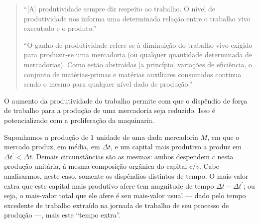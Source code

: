 \begin{quote}
``{[}A{]} produtividade sempre diz respeito ao trabalho. O nível de produtividade nos informa uma determinada relação entre o trabalho vivo executado e o produto.''

``O ganho de produtividade refere-se à diminuição do trabalho vivo exigido para produzir-se uma mercadoria (ou qualquer quantidade determinada de mercadorias). Como estão abstraídas {[}a princípio{]} variações de eficiência, o conjunto de matérias-primas e matérias auxiliares consumidos continua sendo o mesmo para qualquer nível dado de produção.'' \parencite[p. 233]{SaBarreto2021a}
\end{quote}

O aumento da produtividade do trabalho permite com que o dispêndio de força de trabalho para a produção de uma mercadoria seja reduzido. Isso é potencializado com a proliferação da maquinaria.

Suponhamos a produção de \(1\) unidade de uma dada mercadoria \(M\), em que o mercado produz, em média, em \(\Delta t\), e um capital mais produtivo a produz em \(\Delta t^{\prime}<\Delta t\). Demais circunstâncias são as mesmas: ambos despendem \(c\) nesta produção unitária, à mesma composição orgânica do capital $c/v$. Cabe analisarmos, neste caso, somente os dispêndios distintos de tempo. O mais-valor extra que este capital mais produtivo afere tem magnitude de tempo \(\Delta t-\Delta t^{\prime}\); ou seja, o mais-valor total que ele afere é seu mais-valor usual --- dado pelo tempo excedente de trabalho extraído na jornada de trabalho de seu processo de produção ---, mais este ``tempo extra''.

